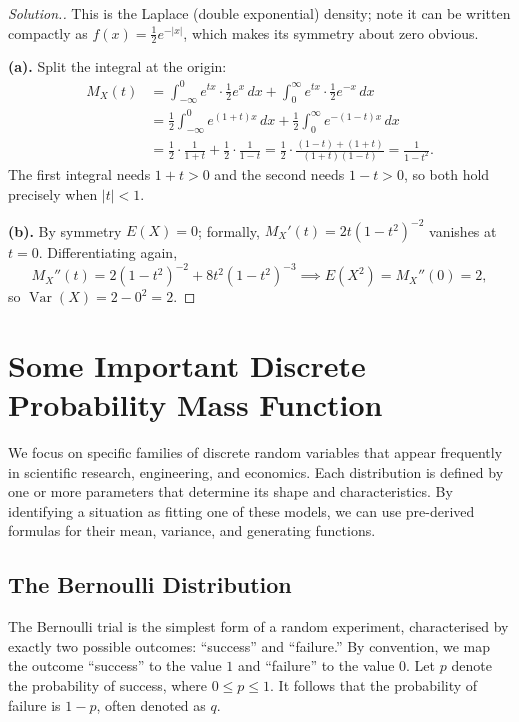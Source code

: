 \documentclass[12pt,a4paper]{report}
\theoremstyle{definition}
\theoremstyle{plain}
\theoremstyle{definition}
\newenvironment{solution}
  {\renewcommand{\qedsymbol}{}\begin{proof}[\textit{Solution}.]}
  {\end{proof}}
\begin{document}
\begin{solution}
This is the Laplace (double exponential) density; note it can be written compactly as
$f(x) = \tfrac12 e^{-|x|}$, which makes its symmetry about zero obvious.

\textbf{(a).} Split the integral at the origin:
\begin{align*}
M_X(t) &= \int_{-\infty}^{0}e^{tx}\cdot\frac{1}{2}e^{x}\,dx
 + \int_{0}^{\infty}e^{tx}\cdot\frac{1}{2}e^{-x}\,dx\\
 &= \frac{1}{2}\int_{-\infty}^{0}e^{(1+t)x}\,dx
  + \frac{1}{2}\int_{0}^{\infty}e^{-(1-t)x}\,dx\\
 &= \frac{1}{2}\cdot\frac{1}{1+t}+\frac{1}{2}\cdot\frac{1}{1-t}
  = \frac{1}{2}\cdot\frac{(1-t)+(1+t)}{(1+t)(1-t)}
  = \frac{1}{1-t^{2}}.
\end{align*}
The first integral needs $1+t>0$ and the second needs $1-t>0$, so both hold precisely
when $|t|<1$.

\textbf{(b).} By symmetry $E(X)=0$; formally, $M_X'(t) = 2t\left(1-t^{2}\right)^{-2}$
vanishes at $t=0$. Differentiating again,
\[M_X''(t) = 2\left(1-t^{2}\right)^{-2}+8t^{2}\left(1-t^{2}\right)^{-3}
 \implies E(X^{2}) = M_X''(0) = 2,\]
so $\operatorname{Var}(X) = 2-0^{2} = 2$.
\end{solution}

\section{Some Important Discrete Probability Mass Function}
We focus on specific families of discrete random variables that appear frequently in scientific research, engineering, and economics. Each distribution is defined by one or more parameters that determine its shape and characteristics. By identifying a situation as fitting one of these models, we can use pre-derived formulas for their mean, variance, and generating functions.


\subsection{The Bernoulli Distribution}
The Bernoulli trial is the simplest form of a random experiment, characterised by exactly two possible outcomes: ``success'' and ``failure.'' By convention, we map the outcome ``success'' to the value $1$ and ``failure'' to the value $0$. Let $p$ denote the probability of success, where $0 \le p \le 1$. It follows that the probability of failure is $1-p$, often denoted as $q$.
\end{document}
